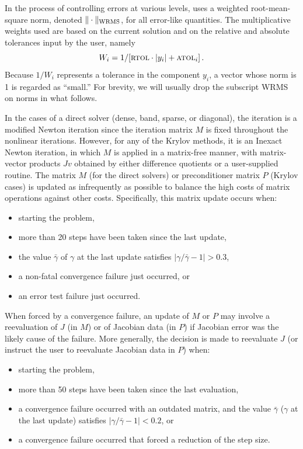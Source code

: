 In the process of controlling errors at various levels, {\cvodes} uses
a weighted root-mean-square norm, denoted
$\|\cdot\|_{\mbox{\scriptsize WRMS}}$, for all error-like quantities.
The multiplicative weights used are based on the current solution and
on the relative and absolute tolerances input by the user, namely
\begin{equation}\label{e:errwt}
 W_i = 1 / [ \mbox{\sc rtol} \cdot |y_i| + \mbox{\sc atol}_i ] \, .
\end{equation}
Because $1/W_i$ represents a tolerance in the component $y_i$, a vector
whose norm is 1 is regarded as ``small.''  For brevity, we will
usually drop the subscript WRMS on norms in what follows.

In the cases of a direct solver (dense, band, sparse, or diagonal), the
iteration is a modified Newton iteration since the iteration matrix
$M$ is fixed throughout the nonlinear iterations.  However, for any
of the Krylov methods, it is an Inexact Newton iteration, in which $M$
is applied in a matrix-free manner, with matrix-vector products $Jv$
obtained by either difference quotients or a user-supplied routine.
The matrix $M$ (for the direct solvers) or preconditioner matrix $P$
(Krylov cases) is updated as infrequently as possible to balance the
high costs of matrix operations against other costs.  Specifically,
this matrix update occurs when:
\begin{itemize}
\item starting the problem,
\item more than 20 steps have been taken since the last update,
\item the value $\bar{\gamma}$ of $\gamma$ at the last update
satisfies $|\gamma/\bar{\gamma} - 1| > 0.3$,
\item a non-fatal convergence failure just occurred, or
\item an error test failure just occurred.
\end{itemize}
When forced by a convergence failure, an update of $M$ or $P$ may
involve a reevaluation of $J$ (in $M$) or of Jacobian data
(in $P$) if Jacobian error was the likely cause of
the failure.  More generally, the decision is made to reevaluate $J$
(or instruct the user to reevaluate Jacobian data in $P$) when:
\begin{itemize}
\item starting the problem,
\item more than 50 steps have been taken since the last evaluation,
\item a convergence failure occurred with an outdated matrix, and
the value $\bar{\gamma}$ ($\gamma$ at the last update)
satisfies $|\gamma/\bar{\gamma} - 1| < 0.2$, or
\item a convergence failure occurred that forced a reduction of the step size.
\end{itemize}


